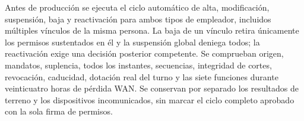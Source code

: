 Antes de producción se ejecuta el ciclo automático de alta, modificación, suspensión, baja y reactivación para ambos tipos de empleador, incluidos múltiples vínculos de la misma persona. La baja de un vínculo retira únicamente los permisos sustentados en él y la suspensión global deniega todos; la reactivación exige una decisión posterior competente. Se comprueban origen, mandatos, suplencia, todos los instantes, secuencias, integridad de cortes, revocación, caducidad, dotación real del turno y las siete funciones durante veinticuatro horas de pérdida WAN. Se conservan por separado los resultados de terreno y los dispositivos incomunicados, sin marcar el ciclo completo aprobado con la sola firma de permisos.
